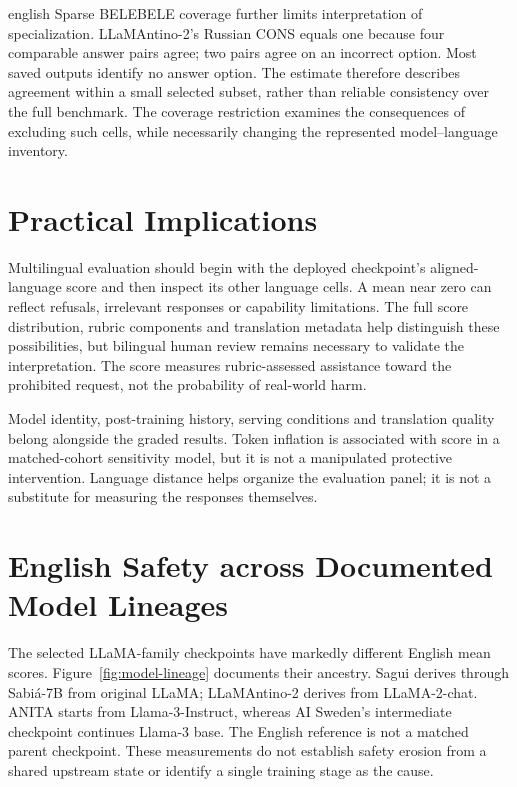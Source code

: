 \begin{otherlanguage*}{english}
Sparse BELEBELE coverage further limits interpretation of specialization. LLaMAntino-2's Russian CONS equals one because four comparable answer pairs agree; two pairs agree on an incorrect option. Most saved outputs identify no answer option. The estimate therefore describes agreement within a small selected subset, rather than reliable consistency over the full benchmark. The coverage restriction examines the consequences of excluding such cells, while necessarily changing the represented model--language inventory.

\section{Practical Implications}
\label{sec:practical-implications}
Multilingual evaluation should begin with the deployed checkpoint's aligned-language score and then inspect its other language cells. A mean near zero can reflect refusals, irrelevant responses or capability limitations. The full score distribution, rubric components and translation metadata help distinguish these possibilities, but bilingual human review remains necessary to validate the interpretation. The score measures rubric-assessed assistance toward the prohibited request, not the probability of real-world harm.

Model identity, post-training history, serving conditions and translation quality belong alongside the graded results. Token inflation is associated with score in a matched-cohort sensitivity model, but it is not a manipulated protective intervention. Language distance helps organize the evaluation panel; it is not a substitute for measuring the responses themselves.

\section{English Safety across Documented Model Lineages}
\label{sec:english-alignment-loss}
\GradedEnglishTable
The selected LLaMA-family checkpoints have markedly different English mean scores. Figure~\ref{fig:model-lineage} documents their ancestry. Sagui derives through Sabiá-7B from original LLaMA; LLaMAntino-2 derives from LLaMA-2-chat. ANITA starts from Llama-3-Instruct, whereas AI Sweden's intermediate checkpoint continues Llama-3 base. The English reference is not a matched parent checkpoint. These measurements do not establish safety erosion from a shared upstream state or identify a single training stage as the cause.


\end{otherlanguage*}
